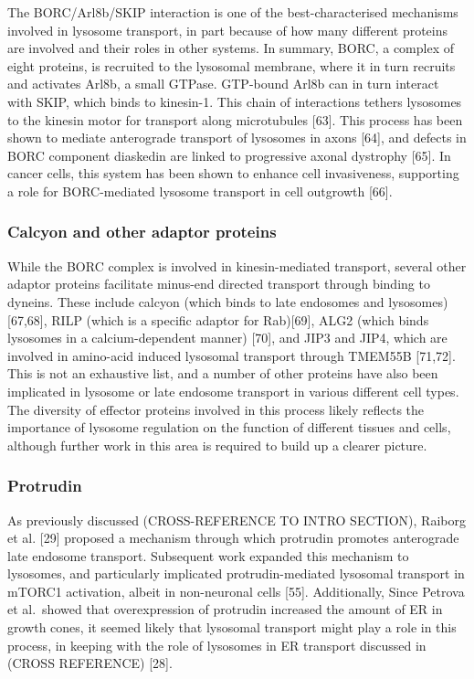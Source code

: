 \documentclass[
  12pt,
  a4paper,
]{book}
\begin{document}
The BORC/Arl8b/SKIP interaction is one of the best-characterised mechanisms involved in lysosome transport, in part because of how many different proteins are involved and their roles in other systems. In summary, BORC, a complex of eight proteins, is recruited to the lysosomal membrane, where it in turn recruits and activates Arl8b, a small GTPase. GTP-bound Arl8b can in turn interact with SKIP, which binds to kinesin-1. This chain of interactions tethers lysosomes to the kinesin motor for transport along microtubules {[}63{]}. This process has been shown to mediate anterograde transport of lysosomes in axons {[}64{]}, and defects in BORC component diaskedin are linked to progressive axonal dystrophy {[}65{]}. In cancer cells, this system has been shown to enhance cell invasiveness, supporting a role for BORC-mediated lysosome transport in cell outgrowth {[}66{]}.

\hypertarget{calcyon-and-other-adaptor-proteins}{%
\subsubsection{Calcyon and other adaptor proteins}\label{calcyon-and-other-adaptor-proteins}}

While the BORC complex is involved in kinesin-mediated transport, several other adaptor proteins facilitate minus-end directed transport through binding to dyneins. These include calcyon (which binds to late endosomes and lysosomes){[}67,68{]}, RILP (which is a specific adaptor for Rab){[}69{]}, ALG2 (which binds lysosomes in a calcium-dependent manner) {[}70{]}, and JIP3 and JIP4, which are involved in amino-acid induced lysosomal transport through TMEM55B {[}71,72{]}. This is not an exhaustive list, and a number of other proteins have also been implicated in lysosome or late endosome transport in various different cell types. The diversity of effector proteins involved in this process likely reflects the importance of lysosome regulation on the function of different tissues and cells, although further work in this area is required to build up a clearer picture.

\hypertarget{protrudin-1}{%
\subsubsection{Protrudin}\label{protrudin-1}}

As previously discussed (CROSS-REFERENCE TO INTRO SECTION), Raiborg et al. {[}29{]} proposed a mechanism through which protrudin promotes anterograde late endosome transport. Subsequent work expanded this mechanism to lysosomes, and particularly implicated protrudin-mediated lysosomal transport in mTORC1 activation, albeit in non-neuronal cells {[}55{]}. Additionally, Since Petrova et al.~showed that overexpression of protrudin increased the amount of ER in growth cones, it seemed likely that lysosomal transport might play a role in this process, in keeping with the role of lysosomes in ER transport discussed in (CROSS REFERENCE) {[}28{]}.
\end{document}
